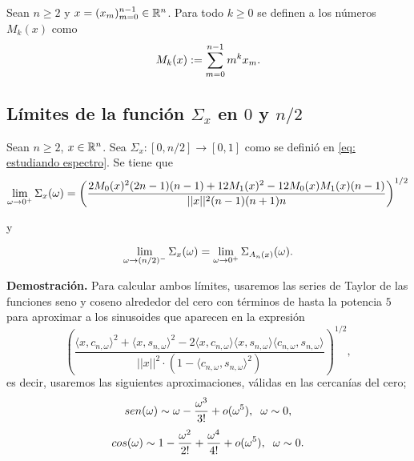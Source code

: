 
\begin{defi}
\label{def: momentos de x}
Sean $n \geq 2$ y $x= (x_{m})_{m=0}^{n-1} \in \mathbb{R}^{n}$.
Para todo $k \geq 0$
se definen a los números $M_{k}(x)$ como
	\begin{equation}
	\label{eq: momento k esimo de x}
	M_{k}(x) := \sum\limits_{m=0}^{n-1}m^{k}x_{m}.
	\end{equation}
\end{defi}

\subsection{Límites de la función $\Sigma_{x}$ en $0$ y $n/2$}

\begin{teo}
\label{teo: limite del espectro por cero}
Sean $n \geq 2$, $x \in \mathbb{R}^{n}$.
Sea $\Sigma_{x}: [0, n/2] \rightarrow [0,1]$ 
como se definió en \eqref{eq: estudiando espectro}.
Se tiene que 
\begin{equation}
\label{eq: limite del espectro a cero}
\lim\limits_{\omega \rightarrow 0^{+}}{\Sigma_{x}(\omega)}
=
\left(
\frac{
2M_{0}(x)^{2}(2n-1)(n-1) + 12M_{1}(x)^{2} - 12M_{0}(x)M_{1}(x)(n-1)
}{
||x||^{2} (n-1)(n+1)n}
\right)^{1/2}
\end{equation}

y

\begin{equation}
\label{eq: limite del espectro a n medios}
\lim\limits_{\omega \rightarrow (n/2)^{-}}{\Sigma_{x}(\omega)}
= \lim\limits_{\omega \rightarrow 0^{+}}{\Sigma_{A_{n}(x)}(\omega)}.
\end{equation}
\end{teo}
\noindent
\textbf{Demostración.}
Para calcular ambos límites, 
usaremos las series de Taylor
de las funciones seno y coseno alrededor del cero
con términos de hasta la potencia $5$ para aproximar
a los sinusoides que aparecen en la expresión 
\begin{equation}
\label{eq1: 22May}
\left(		  
		  \frac{\langle x, c_{n, \omega } \rangle^{2} +  \langle x, s_{n, \omega } \rangle^{2}	
	       -2  \langle x, c_{n, \omega } \rangle \langle x, s_{n, \omega } \rangle \langle c_{n, \omega }, s_{n, \omega } \rangle}{ || x ||^{2} \cdot
	       (1- \langle c_{n, \omega }, s_{n, \omega } \rangle^{2})}	  
\right) ^{1/2},
\end{equation}
es decir, usaremos
las siguientes aproximaciones, válidas en las cercanías
del cero;
\[
sen(\omega) 
\sim
\omega - \frac{\omega^{3}}{3!}
+ o(\omega^{5}),
\hspace{0.2cm} \omega \sim 0,
\]
\[
cos(\omega) \sim 1 - \frac{\omega^{2}}{2!}
+ \frac{\omega^{4}}{4!} + o(\omega^{5}),
\hspace{0.2cm} \omega \sim 0.
\]

